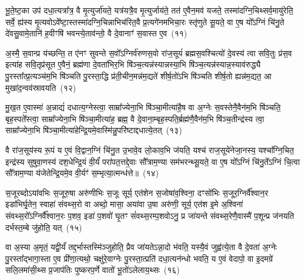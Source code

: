 {\anuvakamend[{अ॒मृत॑मस्मै जायते॒ यस्यै॒ता उ॑पधी॒यन्ते॒ य उ॑ प॒र्जन्य॑ उप॒दधा॑ति सा॒क्षाथ्स॒प्तच॑त्वारिꣳशच्च}]}%

भू॒ते॒ष्ट॒का उप॑ दधा॒त्यत्रा᳚त्र॒ वै मृ॒त्युर्जा॑यते॒ यत्र॑यत्रै॒व मृ॒त्युर्जाय॑ते॒ तत॑ ए॒वैन॒मव॑ यजते॒ तस्मा॑दग्नि॒चिथ्सर्व॒मायु॑रेति॒ सर्वे॒ ह्य॑स्य मृ॒त्यवो\-ऽवे᳚ष्टा॒स्तस्मा॑दग्नि॒चिन्नाभिच॑रित॒वै प्र॒त्यगे॑नमभिचा॒रः स्तृ॑णुते सू॒यते॒ वा ए॒ष यो᳚\-ऽग्निं चि॑नु॒ते दे॑वसु॒वामे॒तानि॑ ह॒वीꣳषि॑ भवन्त्ये॒ताव॑न्तो॒ वै दे॒वानाꣳ॑ स॒वास्त ए॒व~(११)

अ॒स्मै॒ स॒वान्प्र य॑च्छन्ति॒ त ए॑नꣳ सुवन्ते स॒वो᳚\-ऽग्निर्व॑रुणस॒वो रा॑ज॒सूयं॑ ब्रह्मस॒वश्चित्यो॑ दे॒वस्य॑ त्वा सवि॒तुः प्र॑स॒व इत्या॑ह सवि॒तृप्र॑सूत ए॒वैनं॒ ब्रह्म॑णा दे॒वता॑भिर॒भि षि॑ञ्च॒त्यन्न॑स्यान्नस्या॒भि षि॑ञ्च॒त्यन्न॑स्यान्न॒स्याव॑रुद्ध्यै पु॒रस्ता᳚त्प्र॒त्यञ्च॑म॒भि षि॑ञ्चति पु॒रस्ता॒द्धि प्र॑ती॒चीन॒मन्न॑म॒द्यते॑ शीर्\mbox{}ष॒तो॑\-ऽभि षि॑ञ्चति शीर्\mbox{}ष॒तो ह्यन्न॑म॒द्यत॒ आ मुखा॑द॒न्वव॑स्रावयति~(१२)

मु॒ख॒त ए॒वास्मा॑ अ॒न्नाद्यं॑ दधात्य॒ग्नेस्त्वा॒ साम्रा᳚ज्येना॒भि षि॑ञ्चा॒मीत्या॑है॒ष वा अ॒ग्नेः स॒वस्तेनै॒वैन॑म॒भि षि॑ञ्चति॒ बृह॒स्पते᳚स्त्वा॒ साम्रा᳚ज्येना॒भि षि॑ञ्चा॒मीत्या॑ह॒ ब्रह्म॒ वै दे॒वाना॒म्बृह॒स्पति॒र्ब्रह्म॑णै॒वैन॑म॒भि षि॑ञ्च॒तीन्द्र॑स्य त्वा॒ साम्रा᳚ज्येना॒भि षि॑ञ्चा॒मीत्या॑हेन्द्रि॒यमे॒वास्मि॑न्नु॒परि॑ष्टाद्दधात्ये॒तत्~(१३)

वै रा॑ज॒सूय॑स्य रू॒पं य ए॒वं वि॒द्वान॒ग्निं चि॑नु॒त उ॒भावे॒व लो॒काव॒भि ज॑यति॒ यश्च॑ राज॒सूये॑नेजा॒नस्य॒ यश्चा᳚ग्नि॒चित॒ इन्द्र॑स्य सुषुवा॒णस्य॑ दश॒धेन्द्रि॒यं वी॒र्यं॑ परा॑पत॒त्तद्दे॒वाः सौ᳚त्राम॒ण्या सम॑भरन्थ्सू॒यते॒ वा ए॒ष यो᳚\-ऽग्निं चि॑नु॒ते᳚\-ऽग्निं चि॒त्वा सौ᳚त्राम॒ण्या य॑जेतेन्द्रि॒यमे॒व वी॒र्यꣳ॑ स॒म्भृत्या॒त्मन्ध॑त्ते॥~(१४)

{}%

स॒जूरब्दो\-ऽया॑वभिः स॒जूरु॒षा अरु॑णीभिः स॒जूः सूर्य॒ एत॑शेन स॒जोषा॑व॒श्विना॒ दꣳसो॑भिः स॒जूर॒ग्निर्वै᳚श्वान॒र इडा॑भिर्घृ॒तेन॒ स्वाहा॑ संवथ्स॒रो वा अब्दो॒ मासा॒ अया॑वा उ॒षा अरु॑णी॒ सूर्य॒ एत॑श इ॒मे अ॒श्विना॑ संवथ्स॒रो᳚\-ऽग्निर्वै᳚श्वान॒रः प॒शव॒ इडा॑ प॒शवो॑ घृ॒तꣳ सं॑वथ्स॒रम्प॒शवो\-ऽनु॒ प्र जा॑यन्ते संवथ्स॒रेणै॒वास्मै॑ प॒शून्प्र ज॑नयति दर्भस्त॒म्बे जु॑होति॒ यत्~(१५)

वा अ॒स्या अ॒मृतं॒ यद्वी॒र्यं॑ तद्द॒र्भास्तस्मि॑ञ्जुहोति॒ प्रैव जा॑यते\-ऽन्ना॒दो भ॑वति॒ यस्यै॒वं जुह्व॑त्ये॒ता वै दे॒वता॑ अ॒ग्नेः पु॒रस्ता᳚द्भागा॒स्ता ए॒व प्री॑णा॒त्यथो॒ चक्षु॑रे॒वाग्नेः पु॒रस्ता॒त्प्रति॑ दधा॒त्यन॑न्धो भवति॒ य ए॒वं वेदापो॒ वा इ॒दमग्रे॑ सलि॒लमा॑सी॒थ्स प्र॒जाप॑तिः पुष्करप॒र्णे वातो॑ भू॒तो॑\-ऽलेलाय॒थ्सः~(१६)

